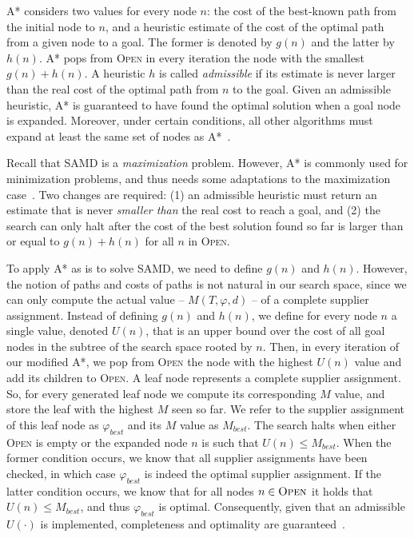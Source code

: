 \documentclass[letterpaper]{article} %
\newcommand{\samd}{\ac{SAMD}\xspace}
\newcommand{\astar}{\textsc{A*}\xspace}
\newcommand{\open}{\textsc{Open}\xspace}
\begin{document}
\astar considers two values for every node $n$: 
the cost of the best-known path from the initial node to $n$, 
and a heuristic estimate of the cost of the optimal path from a given node to a goal. 
The former is denoted by $g(n)$ and the latter by $h(n)$. \astar pops from \open in every iteration the 
node with the smallest $g(n)+h(n)$. 
A heuristic $h$ is called \emph{admissible} if its estimate is never larger than the real cost of the optimal path from $n$ to the goal. 
Given an admissible heuristic, \astar is guaranteed to have found the optimal solution when a goal node is expanded. Moreover, under certain conditions, all other algorithms must expand at least the same set of nodes as \astar~\cite{dechter1985generalized,holte2019OnThe}. 


Recall that \samd is a \emph{maximization} problem. %
However, \astar is commonly used for minimization problems, and thus needs some adaptations to the maximization case~\cite{stern2014max}. Two changes are required: (1) an admissible heuristic must return an estimate that is never \emph{smaller than} the real cost to reach a goal, and (2) the search can only halt after the cost of the best solution found so far is larger than or equal to $g(n)+h(n)$ for all $n$ in \open. 

To apply \astar as is to solve \samd, we need to define $g(n)$ and $h(n)$. However, 
the notion of paths and costs of paths is not natural in our search space, 
since we can only compute the actual value -- $M(T, \varphi,d)$ -- of a complete supplier assignment. 
Instead of defining $g(n)$ and $h(n)$, we define for every node $n$ a single value, denoted $U(n)$, 
that is an upper bound over the cost of all goal nodes in the subtree of the search space rooted by $n$. 
Then, in every iteration of our modified \astar, we pop from \open the node with the highest $U(n)$ value
and add its children to \open. 
A leaf node represents a complete supplier assignment. So, for every generated leaf node we compute its corresponding $M$ value, and store the leaf with the highest $M$ seen so far. We refer to the supplier assignment of this leaf node as $\varphi_{best}$ and its $M$ value as $M_{best}$.  The search halts when either \open is empty or the expanded node $n$ is such that $U(n)\leq M_{best}$. When the former condition occurs, we know that all supplier assignments have been checked, in which case $\varphi_{best}$ is indeed the optimal supplier assignment. If the latter condition occurs, we know that for all nodes $n\in \open$ it holds that $U(n)\leq M_{best}$, and thus $\varphi_{best}$ is optimal. Consequently, given that an admissible $U(\cdot)$ is implemented, completeness and optimality are guaranteed~\cite{stern2014max,holte2019OnThe}. 
\end{document}
